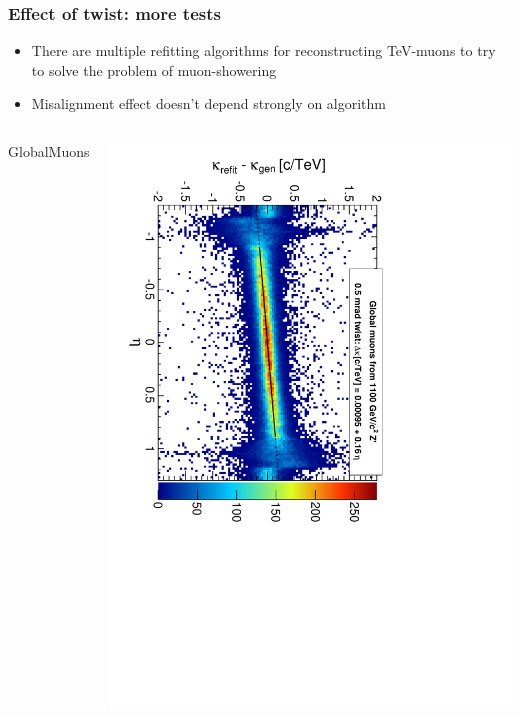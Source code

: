\documentclass[compress]{beamer}
\begin{document}
\begin{frame}
\frametitle{Effect of twist: more tests}
\begin{itemize}
\item There are multiple refitting algorithms for reconstructing
TeV-muons to try to solve the problem of muon-showering
\item Misalignment effect doesn't depend strongly on algorithm
\end{itemize}

\vfill
\begin{columns}
\begin{center}
GlobalMuons
\end{center}
\includegraphics[height=\linewidth, angle=90]{curvbias_vseta_twist0_5mrad_1100_GlobalMuons2.pdf}


\end{columns}
\end{frame}
\end{document}

